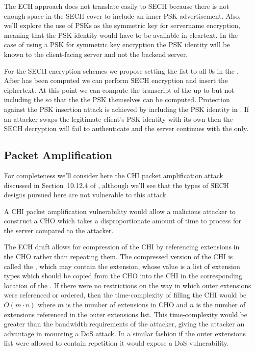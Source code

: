 The \ac{ECH} approach does not translate easily to \ac{SECH} because there is not enough
space in the \ac{SECH} cover to include an inner \ac{PSK} advertisement.
Also, we'll explore the use of \ac{PSK}s as the symmetric key for servername encryption,
meaning that the \ac{PSK} identity would have to be available in cleartext.
In the case of using a \ac{PSK} for symmetric key encryption the \ac{PSK} identity will be known
to the client-facing server and not the backend server.

For the \ac{SECH} encryption schemes we propose
setting the  list to all 0s in the .
After  has been computed we can perform \ac{SECH}
encryption and insert the ciphertext. At this point we can compute
the transcript of the  up to but not including
the  so that the
the \ac{PSK}  themselves can be computed.
Protection against the \ac{PSK} insertion attack is achieved by including the \ac{PSK}
identity in . If an attacker swaps the legitimate client's \ac{PSK} identity with its
own then the \ac{SECH} decryption will fail to authenticate and the server continues with the  only.

\subsection{ Packet Amplification}

For completeness we'll consider here the \ac{CHI}
packet amplification attack discussed in Section~10.12.4 of \cite{esni}, although we'll see that the
types of \ac{SECH} designs pursued here are not vulnerable to this attack.

A \ac{CHI} packet amplification
vulnerability would allow a malicious attacker to construct
a \ac{CHO} which takes a disproportionate amount
of time to process for the server compared to the attacker.

The \ac{ECH} draft allows for compression of the
\ac{CHI} by referencing extensions in the
\ac{CHO} rather than repeating them.
The compressed version of the \ac{CHI} is
called the , which may
contain the \varechouterextensions{} extension,
whose value is a list of extension types which should be copied
from the \ac{CHO} into the \ac{CHI}
in the corresponding location of the \varechouterextensions{}.
If there were no restrictions on the way in which outer extensions
were referenced or ordered, then the time-complexity of filling
the \ac{CHI} would be $O(m\cdot n)$ where $m$ is the number of extensions in \ac{CHO} and $n$ is the
number of extensions referenced in the outer extensions list.
This time-complexity would be greater than the bandwidth requirements of the attacker, giving the attacker an advantage in
mounting a \ac{DoS} attack.
In a similar fashion if the outer extensions list were allowed to contain repetition it would expose a \ac{DoS} vulnerability.

